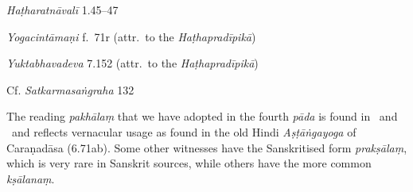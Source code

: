 \begin{ekdosis}
\begin{sources}[hp02_026]
\end{sources}

\begin{testimonia}[hp02_026]
\emph{Haṭharatnāvalī} 1.45–47

\begin{versinnote}
\end{versinnote} 

\emph{Yogacintāmaṇi} f.~71r (attr.~to the \emph{Haṭhapradīpikā})

\begin{versinnote}
\end{versinnote}

\emph{Yuktabhavadeva} 7.152 (attr.~to the \emph{Haṭhapradīpikā})

\begin{versinnote}
\end{versinnote}

Cf. \emph{Satkarmasaṅgraha} 132

\begin{versinnote}
\end{versinnote}

\end{testimonia}

\begin{philcomm}[hp02_026]
The reading \emph{pakhālaṃ} that we have adopted in the fourth \emph{pāda} is found in \betaOmega \ and \alphaOne \ and reflects vernacular usage as found in the old Hindi \emph{Aṣṭāṅgayoga} of Caraṇadāsa (6.71ab). Some other witnesses have the Sanskritised  form \emph{prakṣālaṃ}, which is very rare in Sanskrit sources, while others have the more common \emph{kṣālanaṃ}.


\end{philcomm}
\end{ekdosis}

